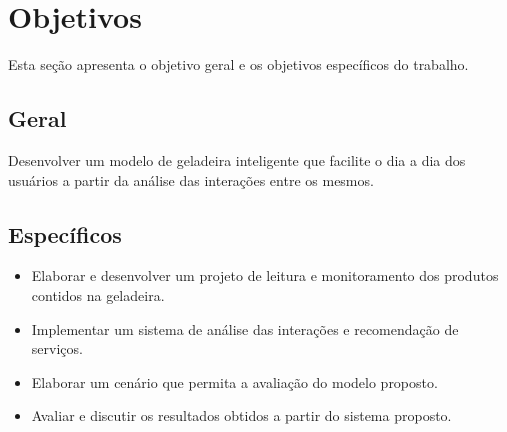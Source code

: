 \section{Objetivos}
Esta seção apresenta o objetivo geral e os objetivos específicos do trabalho.

\subsection{Geral}



Desenvolver um modelo de geladeira inteligente que facilite o dia a dia dos usuários a partir da análise das interações entre os mesmos.
    

\subsection{Específicos}


\begin{itemize} \parskip -1pt
	\item Elaborar e desenvolver um projeto de leitura e monitoramento dos produtos contidos na geladeira.
	\item Implementar um sistema de análise das interações e recomendação de serviços.
	\item Elaborar um cenário que permita a avaliação do modelo proposto.
	\item Avaliar e discutir os resultados obtidos a partir do sistema proposto.


\end{itemize}

